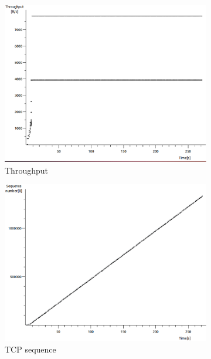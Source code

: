 \documentclass[conference,a4paper]{IEEEtran}
\begin{document}
\begin{figure}
 \centering
 \begin{subfigure}[b]{0.2\textwidth}
  \includegraphics[width=\textwidth]{s1-3_thru}
  \caption{Throughput}
 \end{subfigure}
 \begin{subfigure}[b]{0.2\textwidth}
  \includegraphics[width=\textwidth]{s1-3_seq}
  \caption{TCP sequence}
 \end{subfigure}
 \begin{subfigure}[b]{0.2\textwidth}

\end{subfigure}
\end{figure}
\end{document}
